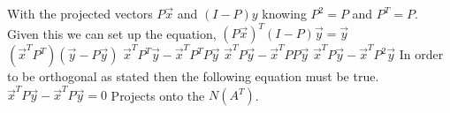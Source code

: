 		With the projected vectors $P\vec{x}$ and $(I-P)y$ knowing $P^2=P$ and $P^T=P$. Given this we can set up the equation,
		\newline
		$(P\vec{x})^T(I-P)\vec{y}=\vec{y}$
		\newline
		$(\vec{x}^TP^T)(\vec{y}-P\vec{y})$
		\newline
		$\vec{x}^TP^T\vec{y}-\vec{x}^TP^TP\vec{y}$
		\newline
		$\vec{x}^TP\vec{y}-\vec{x}^TPP\vec{y}$
		\newline
		$\vec{x}^TP\vec{y}-\vec{x}^TP^2\vec{y}$
		\newline
		In order to be orthogonal as stated then the following equation must be true.
		\newline
		$\vec{x}^TP\vec{y}-\vec{x}^TP\vec{y}=0$
		\newline
		Projects onto the $N(A^T)$.
